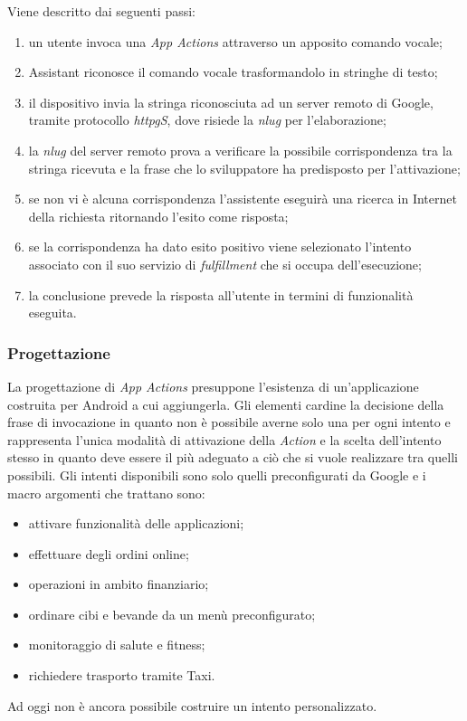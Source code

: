		Viene descritto dai seguenti passi:
		\begin{enumerate}
			\item un utente invoca una \emph{App Actions} attraverso un apposito comando vocale;
			\item Assistant riconosce il comando vocale trasformandolo in stringhe di testo;
			\item il dispositivo invia la stringa riconosciuta ad un server remoto di Google, tramite protocollo \emph{\gls{httpg}S}, dove risiede la \emph{\gls{nlug}} per l'elaborazione;
			\item la \emph{\gls{nlug}} del server remoto prova a verificare la possibile corrispondenza tra la stringa ricevuta e la frase che lo sviluppatore ha predisposto per l'attivazione;
			\item se non vi è alcuna corrispondenza l'assistente eseguirà una ricerca in Internet della richiesta ritornando l'esito come risposta;
			\item se la corrispondenza ha dato esito positivo viene selezionato l'intento associato con il suo servizio di \emph{fulfillment} che si occupa dell'esecuzione;
			\item la conclusione prevede la risposta all'utente in termini di funzionalità eseguita.
		\end{enumerate}
		\subsubsection{Progettazione}
		La progettazione di \emph{App Actions} presuppone l'esistenza di un'applicazione costruita per Android a cui aggiungerla. Gli elementi cardine la decisione della frase di invocazione in quanto non è possibile averne solo una per ogni intento e rappresenta l'unica modalità di attivazione della \emph{Action} e la scelta dell'intento stesso in quanto deve essere il più adeguato a ciò che si vuole realizzare tra quelli possibili. Gli intenti disponibili sono solo quelli preconfigurati da Google e i macro argomenti che trattano sono:
		\begin{itemize}
			\item attivare funzionalità delle applicazioni;
			\item effettuare degli ordini online;
			\item operazioni in ambito finanziario;
			\item ordinare cibi e bevande da un menù preconfigurato;
			\item monitoraggio di salute e fitness;
			\item richiedere trasporto tramite Taxi.
		\end{itemize}
		Ad oggi non è ancora possibile costruire un intento personalizzato.
